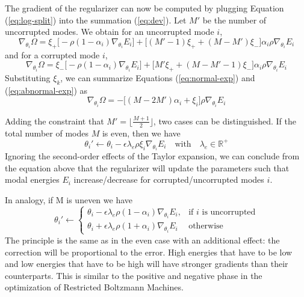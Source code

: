 The gradient of the regularizer can now be computed by plugging Equation (\ref{eq:log-split}) into the summation (\ref{eq:dev}). Let $M'$ be the number of uncorrupted modes. We obtain for an uncorrupted mode $i$,
\begin{equation}
\nabla_{\theta_i}\Omega = \xi_+\big[ -\rho(1-\alpha_i)\nabla_{\theta_i}E_i \big] + \big[(M'-1)\xi_+ + (M-M')\xi_-\big]\alpha_i\rho\nabla_{\theta_i}E_i
\label{eq:normal-exp}
\end{equation}
and for a corrupted mode $i$,
\begin{equation}
\nabla_{\theta_i}\Omega =\xi_-\big[ -\rho(1-\alpha_i)\nabla_{\theta_i}E_i \big] + \big[M'\xi_+ + (M-M'-1)\xi_-\big]\alpha_i\rho\nabla_{\theta_i}E_i
\label{eq:abnormal-exp}
\end{equation}
Substituting $\xi_k$, we can summarize Equations (\ref{eq:normal-exp}) and (\ref{eq:abnormal-exp}) as
\begin{equation}
\boxed{\nabla_{\theta_i}\Omega = -\big[(M-2M')\alpha_i + \xi_i\big]\rho\nabla_{\theta_i}E_i}
\end{equation}


Adding the constraint that $M' = \lfloor \frac{M+1}{2} \rfloor$, two cases can be distinguished. If the total number of modes $M$ is even, then we have
\begin{equation}
\theta_i' \leftarrow \theta_i - \epsilon\lambda_e\rho\xi_i\nabla_{\theta_i}E_i \quad \text{with} \quad \lambda_e \in \mathbb{R}^+
\end{equation}
Ignoring the second-order effects of the Taylor expansion, we can conclude from the equation above that the regularizer will update the parameters such that modal energies $E_i$ increase/decrease for corrupted/uncorrupted modes $i$.

In analogy, if M is uneven we have
\begin{equation}
\theta_i' \leftarrow \begin{cases}
       \theta_i - \epsilon\lambda_e\rho(1-\alpha_i)\nabla_{\theta_i}E_i, & \text{if $i$ is uncorrupted} \\
       \theta_i + \epsilon\lambda_e\rho(1+\alpha_i)\nabla_{\theta_i}E_i & \text{otherwise}
    \end{cases}
\end{equation}
The principle is the same as in the even case with an additional effect: the correction will be proportional to the error. High energies that have to be low and low energies that have to be high will have stronger gradients than their counterparts. This is similar to the positive and negative phase in the optimization of Restricted Boltzmann Machines.

